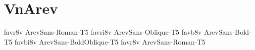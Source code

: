\documentclass[sample]{vnsample}
\begin{document}
\section{VnArev}
  {favr8v}  {ArevSans-Roman-T5}
 {favri8v} {ArevSans-Oblique-T5}
  {favb8v}  {ArevSans-Bold-T5}
 {favbi8v} {ArevSans-BoldOblique-T5}
  {favr8v}  {ArevSans-Roman-T5}
\end{document}
